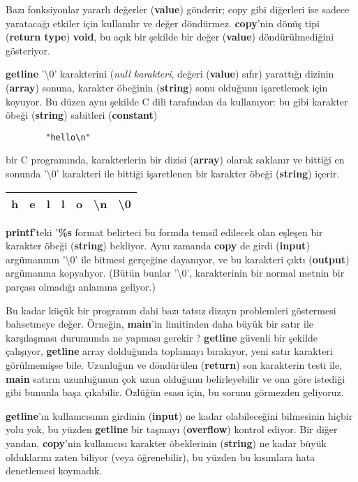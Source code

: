 \documentclass[a4paper,12pt,oneside]{book}
\begin{document}
\par Bazı fonksiyonlar yararlı değerler (\textbf{value}) gönderir; copy gibi diğerleri ise sadece yaratacağı etkiler için kullanılır ve değer döndürmez. \textbf{copy}'nin dönüş tipi (\textbf{return type}) \textbf{void}, bu açık bir şekilde bir değer (\textbf{value}) döndürülmediğini gösteriyor.
\par \textbf{getline} '\textbackslash 0' karakterini (\textit{null karakteri}, değeri (\textbf{value}) sıfır) yarattığı dizinin (\textbf{array}) sonuna, karakter öbeğinin (\textbf{string}) sonu olduğunu işaretlemek için koyuyor. Bu düzen aynı şekilde C dili tarafından da kullanıyor: bu gibi karakter öbeği (\textbf{string}) sabitleri (\textbf{constant})
\begin{lstlisting}
		"hello\n"
\end{lstlisting}
bir C programında, karakterlerin bir dizisi (\textbf{array}) olarak saklanır ve bittiği en sonunda '\textbackslash0' karakteri ile bittiği işaretlenen bir karakter öbeği (\textbf{string}) içerir.

\begin{table}[h]
\centering
\begin{tabular}{|c|c|c|c|c|c|c|}
\hline
h & e & l & l & o & \textbackslash{}n & \textbackslash{}0 \\ \hline
\end{tabular}
\end{table}

\textbf{printf}'teki '\textbf{\%s} format belirteci bu formda temsil edilecek olan eşleşen bir karakter öbeği (\textbf{string}) bekliyor. Aynı zamanda \textbf{copy} de girdi (\textbf{input}) argümanının '\textbackslash 0' ile bitmesi gerçeğine dayanıyor, ve bu karakteri çıktı (\textbf{output}) argümanına kopyalıyor. (Bütün bunlar '\textbackslash 0', karakterinin bir normal metnin bir parçası olmadığı anlamına geliyor.)
\par Bu kadar küçük bir programın dahi bazı tatsız dizayn problemleri göstermesi bahsetmeye değer. Örneğin, \textbf{main}'in limitinden daha büyük bir satır ile karşılaşması durumunda ne yapması gerekir ? \textbf{getline} güvenli bir şekilde çalışıyor, \textbf{getline} array dolduğunda toplamayı bırakıyor, yeni satır karakteri görülmemişse bile. Uzunluğun ve döndürülen (\textbf{return}) son karakterin testi ile, \textbf{main} satırın uzunluğunun çok uzun olduğunu belirleyebilir ve ona göre istediği gibi bununla başa çıkabilir. Özlüğün esası için, bu sorunu görmezden geliyoruz.
\par \textbf{getline}'ın kullanıcısının girdinin (\textbf{input}) ne kadar olabileceğini bilmesinin hiçbir yolu yok, bu yüzden \textbf{getline} bir taşmayı (\textbf{overflow}) kontrol ediyor. Bir diğer yandan, \textbf{copy}'nin kullanıcısı karakter öbeklerinin (\textbf{string}) ne kadar büyük olduklarını zaten biliyor (veya öğrenebilir), bu yüzden bu kısımlara hata denetlemesi koymadık. \\
\end{document}
